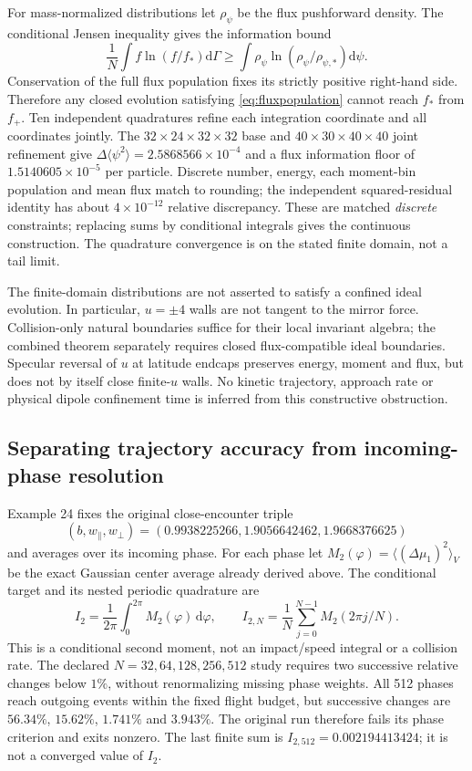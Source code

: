 \documentclass[11pt,letterpaper]{article}
\newcommand{\dd}{\mathrm d}
\begin{document}
For mass-normalized distributions let $\rho_\psi$ be the flux pushforward
density. The conditional Jensen inequality gives the information bound
\begin{equation}
 \frac1N\int f\ln(f/f_*)\dd\Gamma
 \ge\int\rho_\psi\ln(\rho_\psi/\rho_{\psi,*})\dd\psi.
 \label{eq:fluxinformationfloor}
\end{equation}
Conservation of the full flux population fixes its strictly positive
right-hand side. Therefore any closed evolution satisfying
\eqref{eq:fluxpopulation} cannot reach $f_*$ from $f_+$.
Ten independent quadratures refine each integration coordinate and all
coordinates jointly. The $32\times24\times32\times32$ base and
$40\times30\times40\times40$ joint refinement give
$\Delta\langle\psi^2\rangle=2.5868566\times10^{-4}$ and a flux information
floor of $1.5140605\times10^{-5}$ per particle. Discrete number, energy,
each moment-bin population and mean flux match to rounding; the independent
squared-residual identity has about $4\times10^{-12}$ relative discrepancy.
These are matched \emph{discrete} constraints; replacing sums by conditional
integrals gives the continuous construction. The quadrature convergence is
on the stated finite domain, not a tail limit.

The finite-domain distributions are not asserted to satisfy a confined
ideal evolution. In particular, $u=\pm4$ walls are not tangent to the
mirror force. Collision-only natural boundaries suffice for their local
invariant algebra; the combined theorem separately requires closed
flux-compatible ideal boundaries. Specular reversal of $u$ at latitude
endcaps preserves energy, moment and flux, but does not by itself close
finite-$u$ walls. No kinetic trajectory, approach rate or physical dipole
confinement time is inferred from this constructive obstruction.

\subsection*{Separating trajectory accuracy from incoming-phase resolution}
Example 24 fixes the original close-encounter triple
\[
(b,w_\parallel,w_\perp)=(0.9938225266,1.9056642462,1.9668376625)
\]
and averages over its incoming phase. For each phase let
$M_2(\varphi)=\langle(\Delta\mu_1)^2\rangle_V$ be the exact Gaussian
center average already derived above. The conditional target and its nested
periodic quadrature are
\begin{equation}
 I_2=\frac1{2\pi}\int_0^{2\pi}M_2(\varphi)\,\dd\varphi,
 \qquad I_{2,N}=\frac1N\sum_{j=0}^{N-1}M_2(2\pi j/N).
\end{equation}
This is a conditional second moment, not an impact/speed integral or a
collision rate. The declared $N=32,64,128,256,512$ study requires two
successive relative changes below $1\%$, without renormalizing missing
phase weights. All 512 phases reach outgoing events within the fixed flight
budget, but successive changes are $56.34\%$, $15.62\%$, $1.741\%$ and
$3.943\%$. The original run therefore fails its phase criterion and exits
nonzero. The last finite sum is $I_{2,512}=0.002194413424$;
it is not a converged value of $I_2$.
\end{document}
